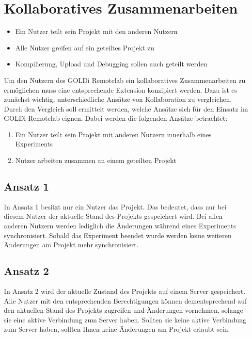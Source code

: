 \section{Kollaboratives Zusammenarbeiten} \label{kollaboration}

\begin{itemize}
    \item Ein Nutzer teilt sein Projekt mit den anderen Nutzern
    \item Alle Nutzer greifen auf ein geteiltes Projekt zu
    \item Kompilierung, Upload und Debugging sollen auch geteilt werden
\end{itemize}

Um den Nutzern des GOLDi Remotelab ein kollaboratives Zusammenarbeiten zu ermöglichen muss eine entsprechende Extension konzipiert werden. Dazu ist es zunächst wichtig, unterschiedliche Ansätze von Kollaboration zu vergleichen. Durch den Vergleich soll ermittelt werden, welche Ansätze sich für den Einsatz im GOLDi Remotelab eignen. Dabei werden die folgenden Ansätze betrachtet:

\begin{enumerate}
    \item Ein Nutzer teilt sein Projekt mit anderen Nutzern innerhalb eines Experiments
    \item Nutzer arbeiten zusammen an einem geteilten Projekt
\end{enumerate}

\subsection{Ansatz 1}

In Ansatz 1 besitzt nur ein Nutzer das Projekt. Das bedeutet, dass nur bei diesem Nutzer der aktuelle Stand des Projekts gespeichert wird. Bei allen anderen Nutzern werden lediglich die Änderungen während eines Experiments synchronisiert. Sobald das Experiment beendet wurde werden keine weiteren Änderungen am Projekt mehr synchronisiert.

\subsection{Ansatz 2}

In Ansatz 2 wird der aktuelle Zustand des Projekts auf einem Server gespeichert. Alle Nutzer mit den entsprechenden Berechtigungen können dementsprechend auf den aktuellen Stand des Projekts zugreifen und Änderungen vornehmen, solange sie eine aktive Verbindung zum Server haben. Sollten sie keine aktive Verbindung zum Server haben, sollten Ihnen keine Änderungen am Projekt erlaubt sein.